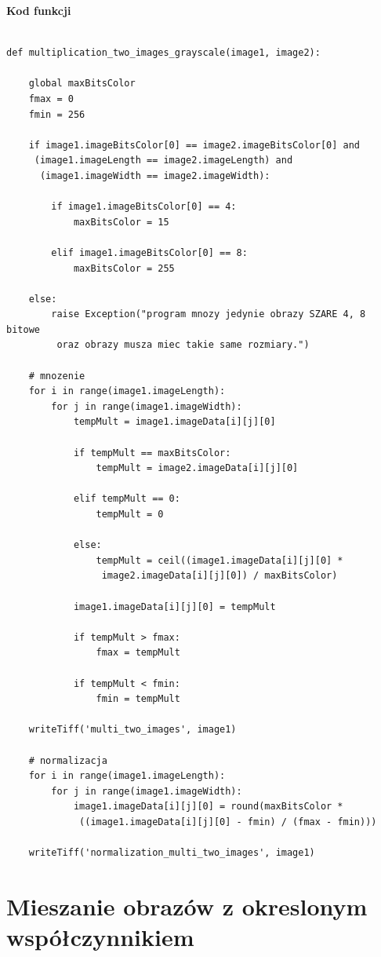 \documentclass[magisterska,openany]{pracadypl}
\begin{document}
\newpage
\textbf{\Large Kod funkcji}
   
\lstset{language=Python}
\vspace{0.25cm}
\begin{lstlisting}[caption={Mnożenie dwóch obrazów}]

def multiplication_two_images_grayscale(image1, image2):

    global maxBitsColor
    fmax = 0
    fmin = 256

    if image1.imageBitsColor[0] == image2.imageBitsColor[0] and
     (image1.imageLength == image2.imageLength) and
      (image1.imageWidth == image2.imageWidth):

        if image1.imageBitsColor[0] == 4:
            maxBitsColor = 15

        elif image1.imageBitsColor[0] == 8:
            maxBitsColor = 255

    else:
        raise Exception("program mnozy jedynie obrazy SZARE 4, 8 bitowe
         oraz obrazy musza miec takie same rozmiary.")

    # mnozenie
    for i in range(image1.imageLength):
        for j in range(image1.imageWidth):
            tempMult = image1.imageData[i][j][0]

            if tempMult == maxBitsColor:
                tempMult = image2.imageData[i][j][0]

            elif tempMult == 0:
                tempMult = 0

            else:
                tempMult = ceil((image1.imageData[i][j][0] *
                 image2.imageData[i][j][0]) / maxBitsColor)

            image1.imageData[i][j][0] = tempMult

            if tempMult > fmax:
                fmax = tempMult

            if tempMult < fmin:
                fmin = tempMult

    writeTiff('multi_two_images', image1)

    # normalizacja
    for i in range(image1.imageLength):
        for j in range(image1.imageWidth):
            image1.imageData[i][j][0] = round(maxBitsColor *
             ((image1.imageData[i][j][0] - fmin) / (fmax - fmin)))

    writeTiff('normalization_multi_two_images', image1)

\end{lstlisting}
\newpage

\section{Mieszanie obrazów z okreslonym współczynnikiem}
\end{document}
